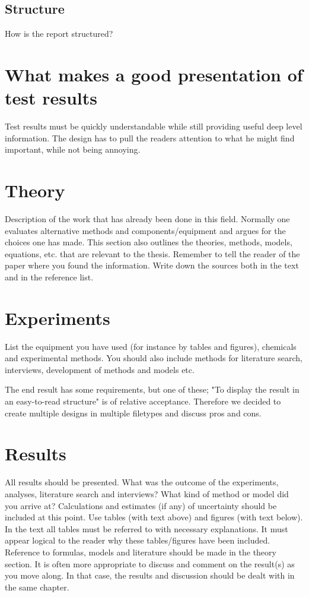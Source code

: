 \documentclass{article}
\begin{document}
	\subsection{Structure}
	How is the report structured?	
\fi	
\pagebreak

\section{What makes a good presentation of test results}

Test results must be quickly understandable while still providing useful deep level information.
The design has to pull the readers attention to what he might find important, while not being annoying. 
\pagebreak

\section{Theory}
Description of the work that has already been done in this field. Normally one
evaluates alternative methods and components/equipment and argues for the choices one has
made. This section also outlines the theories, methods, models, equations, etc. that are
relevant to the thesis. Remember to tell the reader of the paper where you found the
information. Write down the sources both in the text and in the reference list. 
\pagebreak

\section{Experiments}
List the equipment you have used (for instance by tables and figures),
chemicals and experimental methods. You should also include methods for literature search,
interviews, development of methods and models etc. 

The end result has some requirements, but one of these; "To display the result in an easy-to-read
structure" is of relative acceptance.
Therefore we decided to create multiple designs in multiple filetypes and discuss pros and cons.

\pagebreak
 
\section{Results}
All results should be presented. What was the outcome of the experiments, analyses,
literature search and interviews? What kind of method or model did you arrive at?
Calculations and estimates (if any) of uncertainty should be included at this point. Use tables
(with text above) and figures (with text below). In the text all tables must be referred to with
necessary explanations. It must appear logical to the reader why these tables/figures have
been included. Reference to formulas, models and literature should be made in the theory
section. It is often more appropriate to discuss and comment on the result(s) as you move
along. In that case, the results and discussion should be dealt with in the same chapter. 
\pagebreak
\end{document}
